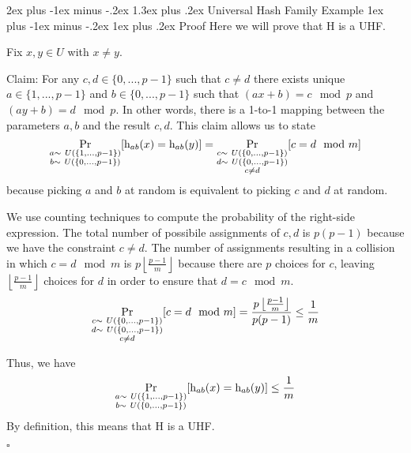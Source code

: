 \documentclass[11pt]{article}
\makeatletter
\renewcommand{\section}{\@startsection{section}{1}{0mm}%
                                 {2ex plus -1ex minus -.2ex}%
                                 {1.3ex plus .2ex}%
                                 {\normalfont\Large\bfseries}}%
\renewcommand{\subsection}{\@startsection{subsection}{2}{0mm}%
                                   {1ex plus -1ex minus -.2ex}%
                                   {1ex plus .2ex}%
                                   {\normalfont\large\bfseries}}%
\newcommand{\pr}{{\bf {\rm Pr}}}
\newcommand{\floor}[1]{\ensuremath{\left\lfloor#1\right\rfloor}}
\newcommand*{\QEDB}{\null\nobreak\hfill\ensuremath{\square}}
\makeatother
\begin{document}
\section{Universal Hash Family Example}
\subsection{Proof}
Here we will prove that $\mathrm{H}$ is a UHF.

Fix $x, y \in U$ with $x \neq y$.

Claim: For any $c, d \in \{0, ..., p-1\}$ such that $c \neq d$ there exists unique $a \in \{1, ..., p-1\}$ and $b \in \{0, ..., p-1\}$ such that $(ax+b) = c \mod p$ and $(ay+b) = d \mod p$.
In other words, there is a 1-to-1 mapping between the parameters $a, b$ and the result $c, d$. 
This claim allows us to state
\[
{\underset{\substack{a\sim\ U(\{1, ..., p-1\}) \\ b\sim\ U(\{0, ..., p-1\})}}{\pr}} [\mathrm{h}_{ab}(x) = \mathrm{h}_{ab}(y)] = 
{\underset{\substack{c\sim\ U(\{0, ..., p-1\}) \\ d\sim\ U(\{0, ..., p-1\}) \\ c \neq d}}{\pr}} [c = d \mod m] 
\]
because picking $a$ and $b$ at random is equivalent to picking $c$ and $d$ at random.

We use counting techniques to compute the probability of the right-side expression. The total number of possibile assignments of $c, d$ is $p(p-1)$ because we have the constraint $c \neq d$. The number of assignments resulting in a collision in which $c = d\mod m$ is $p \floor{\frac{p-1}{m}}$ because there are $p$ choices for $c$, leaving $\left \lfloor{\frac{p-1}{m}}\right \rfloor$ choices for $d$ in order to ensure that $d = c \mod m$. 
\[
{\underset{\substack{c\sim\ U(\{0, ..., p-1\}) \\ d\sim\ U(\{0, ..., p-1\}) \\ c \neq d}}{\pr}} [c = d \mod m] =
\frac{p \floor{\frac{p-1}{m}}}{p(p-1)} \leq \frac{1}{m}
\]

Thus, we have 
\[
{\underset{\substack{a\sim\ U(\{1, ..., p-1\}) \\ b\sim\ U(\{0, ..., p-1\})}}{\pr}} [\mathrm{h}_{ab}(x) = \mathrm{h}_{ab}(y)] \leq \frac{1}{m}
\]
By definition, this means that $\mathrm{H}$ is a UHF. 

\QEDB
\end{document}
